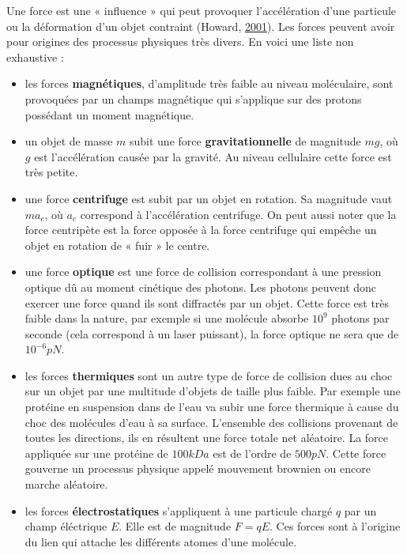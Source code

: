 \documentclass[12pt,a4paper,twoside,openright]{book}
\begin{document}
Une force est une « influence » qui peut provoquer l'accélération d'une
particule ou la déformation d'un objet contraint (Howard,
\hyperref[ref-Howard2001]{2001}). Les forces peuvent avoir pour origines
des processus physiques très divers. En voici une liste non exhaustive :

\begin{itemize}
\item
  les forces \textbf{magnétiques}, d'amplitude très faible au niveau
  moléculaire, sont provoquées par un champs magnétique qui s'applique
  sur des protons possédant un moment magnétique.
\item
  un objet de masse \(m\) subit une force \textbf{gravitationnelle} de
  magnitude \(mg\), où \(g\) est l'accélération causée par la gravité.
  Au niveau cellulaire cette force est très petite.
\item
  une force \textbf{centrifuge} est subit par un objet en rotation. Sa
  magnitude vaut \(ma_c\), où \(a_c\) correspond à l'accélération
  centrifuge. On peut aussi noter que la force centripète est la force
  opposée à la force centrifuge qui empêche un objet en rotation de «
  fuir » le centre.
\item
  une force \textbf{optique} est une force de collision correspondant à
  une pression optique dû au moment cinétique des photons. Les photons
  peuvent donc exercer une force quand ils sont diffractés par un objet.
  Cette force est très faible dans la nature, par exemple si une
  molécule absorbe \(10^9\) photons par seconde (cela correspond à un
  laser puissant), la force optique ne sera que de \(10^{-6}pN\).
\item
  les forces \textbf{thermiques} sont un autre type de force de
  collision dues au choc sur un objet par une multitude d'objets de
  taille plus faible. Par exemple une protéine en suspension dans de
  l'eau va subir une force thermique à cause du choc des molécules d'eau
  à sa surface. L'ensemble des collisions provenant de toutes les
  directions, ils en résultent une force totale net aléatoire. La force
  appliquée sur une protéine de \(100kDa\) est de l'ordre de \(500pN\).
  Cette force gouverne un processus physique appelé mouvement brownien
  ou encore marche aléatoire.
\item
  les forces \textbf{électrostatiques} s'appliquent à une particule
  chargé \(q\) par un champ éléctrique \(E\). Elle est de magnitude
  \(F = qE\). Ces forces sont à l'origine du lien qui attache les
  différents atomes d'une molécule.
\end{itemize}
\end{document}
